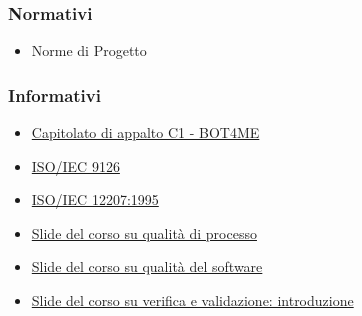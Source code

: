 \subsubsection{Normativi}
\begin{itemize}
	\item Norme di Progetto {\docVersionNdP}
\end{itemize}

\subsubsection{Informativi}
\begin{itemize}
	\item \href{https://www.math.unipd.it/~tullio/IS-1/2021/Progetto/C1.pdf}{\color{blue} Capitolato di appalto C1 - BOT4ME}
 	\item \href{https://it.wikipedia.org/wiki/ISO/IEC_9126}{\color{blue} ISO/IEC 9126}
  	\item \href{https://www.math.unipd.it/~tullio/IS-1/2009/Approfondimenti/ISO_12207-1995.pdf}{\color{blue} ISO/IEC 12207:1995}
   	\item \href{https://www.math.unipd.it/~tullio/IS-1/2021/Dispense/T13.pdf}{\color{blue} Slide del corso su qualità di processo}
    \item \href{https://www.math.unipd.it/~tullio/IS-1/2021/Dispense/T12.pdf}{\color{blue} Slide del corso su qualità del software}
    \item \href{https://www.math.unipd.it/~tullio/IS-1/2021/Dispense/T14.pdf}{\color{blue} Slide del corso su verifica e validazione: introduzione}
\end{itemize}
\newpage